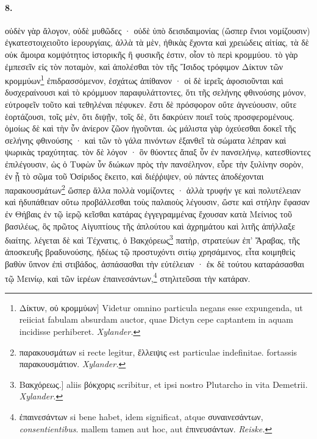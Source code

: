 \documentclass[a4paper, 11pt, oneside, polutonikogreek, german]{article}
\begin{document}
\paragraph{8.}
οὐδὲν γὰρ ἄλογον, οὐδὲ μυθῶδες · οὐδὲ ὑπὸ δεισιδαιμονίας (ὥσπερ ἔνιοι νομίζουσιν) ἐγκατεστοιχειοῦτο ἱερουργίαις, ἀλλὰ τὰ μὲν, ἠθικὰς ἔχοντα καὶ χρειώδεις αἰτίας, τὰ δὲ οὐκ ἄμοιρα κομψότητος ἱστορικῆς ἢ φυσικῆς ἐστιν, οἷον τὸ περὶ κρομμύου. τὸ γὰρ ἐμπεσεῖν εἰς τὸν ποταμὸν, καὶ ἀπολέσθαι τὸν τῆς Ἴσιδος τρόφιμον Δίκτυν τῶν κρομμύων\footnote{Δίκτυν, οὐ κρομμύων] Videtur omnino particula negans esse expungenda, ut reiiciat fabulam absurdam auctor, quae Dictyn cepe captantem in aquam incidisse perhiberet. \emph{Xylander.}} ἐπιδρασσόμενον, ἐσχάτως ἀπίθανον · οἱ δὲ ἱερεῖς ἀφοσιοῦνται καὶ δυσχεραίνουσι καὶ τὸ κρόμμυον παραφυλάττοντες, ὅτι τῆς σελήνης φθινούσης μόνον, εὐτροφεῖν τοῦτο καὶ τεθηλέναι πέφυκεν. ἔστι δὲ πρόσφορον οὔτε ἁγνεύουσιν, οὔτε ἑορτάζουσι, τοῖς μὲν, ὅτι διψῇν, τοῖς δὲ, ὅτι δακρύειν ποιεῖ τοὺς προσφερομένους. ὁμοίως δὲ καὶ τὴν ὗν ἀνίερον ζῶον ἡγοῦνται. ὡς μάλιστα γὰρ ὀχεύεσθαι δοκεῖ τῆς σελήνης φθινούσης · καὶ τῶν τὸ γάλα πινόντων ἐξανθεῖ τὰ σώματα λέπραν καὶ ψωρικὰς τραχύτητας. τὸν δὲ λόγον · ὃν θύοντες ἅπαξ ὗν ἐν πανσελήνῳ, κατεσθίοντες ἐπιλέγουσιν, ὡς ὁ Τυφὼν ὗν διώκων πρὸς τὴν πανσέληνον, εὗρε τὴν ξυλίνην σορὸν, ἐν ᾗ τὸ σῶμα τοῦ Ὀσίριδος ἔκειτο, καὶ διέῤῥιψεν, οὐ πάντες ἀποδέχονται παρακουσμάτων\footnote{παρακουσμάτων si recte legitur, ἔλλειψις est particulae indefinitae. fortassis παρακουσμάτιον. \emph{Xylander.}} ὥσπερ ἄλλα πολλὰ νομίζοντες · ἀλλὰ τρυφήν γε καὶ πολυτέλειαν καὶ ἡδυπάθειαν οὕτω προβάλλεσθαι τοὺς παλαιοὺς λέγουσιν, ὥστε καὶ στήλην ἔφασαν ἐν Θήβαις ἐν τῷ ἱερῷ κεῖσθαι κατάρας ἐγγεγραμμένας ἔχουσαν κατὰ Μείνιος τοῦ βασιλέως, ὃς πρῶτος Αἰγυπτίους τῆς ἀπλούτου καὶ ἀχρημάτου καὶ λιτῆς ἀπήλλαξε διαίτης. λέγεται δὲ καὶ Τέχνατις, ὁ Βακχόρεως\footnote{Βακχόρεως.] aliis βόκχορις scribitur, et ipsi nostro Plutarcho in vita Demetrii. \emph{Xylander.}} πατὴρ, στρατεύων ἐπ' Ἄραβας, τῆς ἀποσκευῆς βραδυνούσης, ἡδέως τῷ προστυχόντι σιτίῳ χρησάμενος, εἶτα κοιμηθεὶς βαθὺν ὕπνον ἐπὶ στιβάδος, ἀσπάσασθαι τὴν εὐτέλειαν · ἐκ δὲ τούτου καταράσασθαι τῷ Μεινίῳ, καὶ τῶν ἱερέων ἐπαινεσάντων,\footnote{ἐπαινεσάντων si bene habet, idem significat, atque συναινεσάντων, \emph{consentientibus}. mallem tamen aut hoc, aut ἐπινευσάντων. \emph{Reiske.}} στηλιτεῦσαι τὴν κατάραν.
\end{document}
